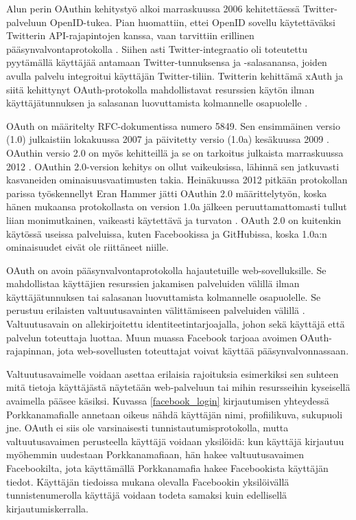 Alun perin OAuthin kehitystyö alkoi marraskuussa 2006 kehitettäessä Twitter-pal\-ve\-luun OpenID-tukea. Pian huomattiin, ettei OpenID sovellu käytettäväksi Twitterin API-rajapintojen kanssa, vaan tarvittiin erillinen pääsynvalvontaprotokolla \cite{oauth_primer}. Siihen asti Twitter-integraatio oli toteutettu pyytämällä käyttäjää antamaan Twitter-tunnuksensa ja -salasanansa, joiden avulla palvelu integroitui käyttäjän Twitter-tiliin. Twitterin kehittämä xAuth ja siitä kehittynyt OAuth-protokolla mahdollistavat resurssien käytön ilman käyttäjätunnuksen ja salasanan luovuttamista kolmannelle osapuolelle \cite{oauth2_0}.

OAuth on määritelty RFC-dokumentissa numero 5849. Sen ensimmäinen versio (1.0) julkaistiin lokakuussa 2007 ja päivitetty versio (1.0a) kesäkuussa 2009 \cite{oauth2_0}. OAuthin versio 2.0 on myös kehitteillä ja se on tarkoitus julkaista marraskuussa 2012 \cite{oauth2_0}. OAuthin 2.0-version kehitys on ollut vaikeuksissa, lähinnä sen jatkuvasti kasvaneiden ominaisuusvaatimusten takia. Heinäkuussa 2012 pitkään protokollan parissa työskennellyt Eran Hammer jätti OAuthin 2.0 määrittelytyön, koska hänen mukaansa protokollasta on version 1.0a jälkeen peruuttamattomasti tullut liian monimutkainen, vaikeasti käytettävä ja turvaton \cite{oauth_ragequit}. OAuth 2.0 on kuitenkin käytössä useissa palveluissa, kuten Facebookissa ja GitHubissa, koska 1.0a:n ominaisuudet eivät ole riittäneet niille.

OAuth on avoin pääsynvalvontaprotokolla hajautetuille web-sovelluksille. Se mahdollistaa käyttäjien resurssien jakamisen palveluiden välillä ilman käyttäjätunnuksen tai salasanan luovuttamista kolmannelle osapuolelle. Se perustuu erilaisten valtuutusavainten välittämiseen palveluiden välillä \cite{oauth2_0}. Valtuutusavain on allekirjoitettu identiteetintarjoajalla, johon sekä käyttäjä että palvelun toteuttaja luottaa. Muun muassa Facebook tarjoaa avoimen OAuth-rajapinnan, jota web-sovellusten toteuttajat voivat käyttää pääsynvalvonnassaan.

Valtuutusavaimelle voidaan asettaa erilaisia rajoituksia esimerkiksi sen suhteen mitä tietoja käyttäjästä näytetään web-palveluun tai mihin resursseihin kyseisellä avaimella pääsee käsiksi. Kuvassa \ref{facebook_login} kirjautumisen yhteydessä Porkkanamafialle annetaan oikeus nähdä käyttäjän nimi, profiilikuva, sukupuoli jne. OAuth ei siis ole varsinaisesti tunnistautumisprotokolla, mutta valtuutusavaimen perusteella käyttäjä voidaan yksilöidä: kun käyttäjä kirjautuu myöhemmin uudestaan Porkkanamafiaan, hän hakee valtuutusavaimen Facebookilta, jota käyttämällä Porkkanamafia hakee Facebookista käyttäjän tiedot. Käyttäjän tiedoissa mukana olevalla Facebookin yksilöivällä tunnistenumerolla käyttäjä voidaan todeta samaksi kuin edellisellä kirjautumiskerralla.

